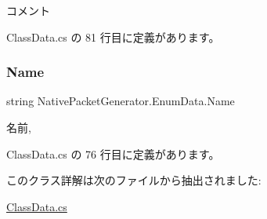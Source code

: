 コメント 



 Class\+Data.\+cs の 81 行目に定義があります。

\mbox{\label{classNativePacketGenerator_1_1EnumData_a64cbf48233dcd6439a93a84195d86632}} 
\subsubsection{\texorpdfstring{Name}{Name}}
{\footnotesize\ttfamily string Native\+Packet\+Generator.\+Enum\+Data.\+Name\hspace{0.3cm}{\ttfamily [get]}}



名前, 



 Class\+Data.\+cs の 76 行目に定義があります。



このクラス詳解は次のファイルから抽出されました\+:\begin{DoxyCompactItemize}
\item 
\mbox{\hyperlink{ClassData_8cs}{Class\+Data.\+cs}}\end{DoxyCompactItemize}
